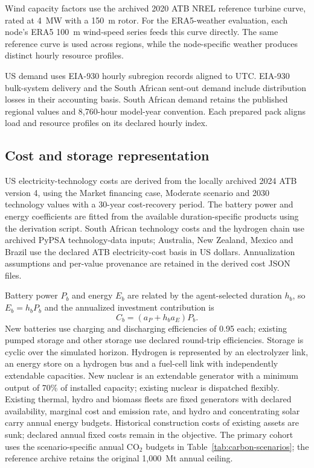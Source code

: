 \documentclass[pdflatex,sn-nature]{sn-jnl}
\begin{document}
Wind capacity factors use the archived 2020 ATB NREL reference turbine curve, rated at 4~MW with a 150~m rotor\cite{nrel_reference4mw150_curve}. For the ERA5-weather evaluation, each node's ERA5 100~m wind-speed series feeds this curve directly. The same reference curve is used across regions, while the node-specific weather produces distinct hourly resource profiles.

US demand uses EIA-930 hourly subregion records aligned to UTC. EIA-930 bulk-system delivery and the South African sent-out demand include distribution losses in their accounting basis. South African demand retains the published regional values and 8,760-hour model-year convention. Each prepared pack aligns load and resource profiles on its declared hourly index.

\subsection{Cost and storage representation}

US electricity-technology costs are derived from the locally archived 2024 ATB version 4, using the Market financing case, Moderate scenario and 2030 technology values with a 30-year cost-recovery period\cite{nrel2024atb}. The battery power and energy coefficients are fitted from the available duration-specific products using the derivation script. South African technology costs and the hydrogen chain use archived PyPSA technology-data inputs\cite{pypsatechdata}; Australia, New Zealand, Mexico and Brazil use the declared ATB electricity-cost basis in US dollars. Annualization assumptions and per-value provenance are retained in the derived cost JSON files.

Battery power $P_b$ and energy $E_b$ are related by the agent-selected duration $h_b$, so $E_b=h_bP_b$ and the annualized investment contribution is
\begin{equation}
C_b=(a_P+h_b a_E)P_b.
\label{eq:battery}
\end{equation}
New batteries use charging and discharging efficiencies of 0.95 each; existing pumped storage and other storage use declared round-trip efficiencies. Storage is cyclic over the simulated horizon. Hydrogen is represented by an electrolyzer link, an energy store on a hydrogen bus and a fuel-cell link with independently extendable capacities. New nuclear is an extendable generator with a minimum output of 70\% of installed capacity; existing nuclear is dispatched flexibly. Existing thermal, hydro and biomass fleets are fixed generators with declared availability, marginal cost and emission rate, and hydro and concentrating solar carry annual energy budgets. Historical construction costs of existing assets are sunk; declared annual fixed costs remain in the objective. The primary cohort uses the scenario-specific annual CO$_2$ budgets in Table~\ref{tab:carbon-scenarios}; the reference archive retains the original 1,000~Mt annual ceiling.
\end{document}
